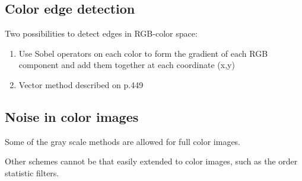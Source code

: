 \subsection{Color edge detection }
Two possibilities to detect edges in RGB-color space:
\begin{enumerate}
	\item Use Sobel operators on each color to form the gradient of each RGB component and add them together at each coordinate (x,y)
	\item Vector method described on p.449
\end{enumerate}

\subsection{Noise in color images }
Some of the gray scale methods are allowed for full color images.

Other schemes cannot be that easily extended to color images, such as the order statistic filters.